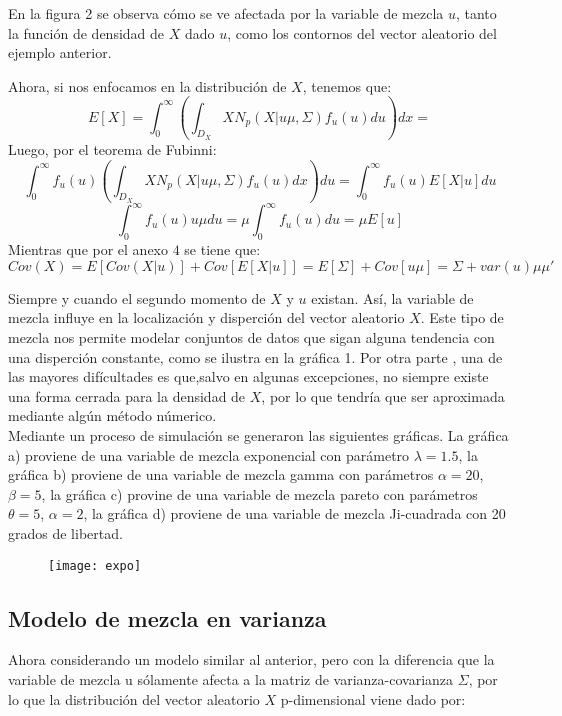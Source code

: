 \documentclass[11pt]{book}
\begin{document}
En la figura 2 se observa cómo se ve afectada por la variable de mezcla $u$, tanto la función de densidad de $X$ dado $u$, como los contornos del vector aleatorio del ejemplo anterior.\\
\pagebreak

Ahora, si nos enfocamos en la distribución de $X$, tenemos que: 
\begin{equation*}
E[X]=\int_{0}^{\infty}(\int_{D_{X}}XN_{p}(X|u\mu,\Sigma)f_{u}(u)du)dx=
\end{equation*}
Luego, por el teorema de Fubinni:
\begin{equation*}
\int_{0}^{\infty}f_{u}(u)(\int_{D_{X}}XN_{p}(X|u\mu,\Sigma)f_{u}(u)dx)du=\int_{0}^{\infty}f_{u}(u)E[X|u]du
\end{equation*}
\begin{equation*}
\int_{0}^{\infty}f_{u}(u)u\mu du=\mu\int_{0}^{\infty}f_{u}(u)du=\mu E[u]
\end{equation*}
 Mientras que por el anexo $4$ se tiene que: 
 \begin{equation*}
 Cov(X)=E[Cov(X|u)]+Cov[E[X|u]]=E[\Sigma]+Cov[u\mu]=\Sigma + var(u)\mu \mu'  
 \end{equation*}
 
 Siempre y cuando el segundo momento de $X$ y $u$ existan. Así, la variable de mezcla influye en la localización y disperción del vector aleatorio $X$. Este tipo de mezcla nos permite modelar conjuntos de datos que sigan alguna tendencia con una disperción constante, como se ilustra en la gráfica 1. Por otra parte , una de las mayores difícultades es que,salvo en algunas excepciones, no siempre existe una forma cerrada para la densidad de $X$, por lo que tendría que ser aproximada mediante algún método númerico.\\

Mediante un proceso de simulación se generaron las siguientes gráficas. La gráfica a) proviene de una variable de mezcla exponencial con parámetro $\lambda=1.5$, la gráfica b) proviene de una variable de mezcla gamma con parámetros $\alpha=20$, $\beta=5$, la gráfica c) provine de una variable de mezcla pareto con parámetros $\theta=5$, $\alpha=2$, la gráfica d) proviene de una variable de mezcla Ji-cuadrada con 20 grados de libertad.\\

\begin{figure}[h]
\centering
\texttt{[image: expo]}
\end{figure}


\pagebreak
\subsection*{Modelo de mezcla en varianza}
Ahora considerando un modelo similar al anterior, pero con la diferencia que la variable de mezcla u sólamente afecta a la matriz de varianza-covarianza $\Sigma$, por lo que la distribución del vector aleatorio $X$ p-dimensional viene dado por:
\end{document}
